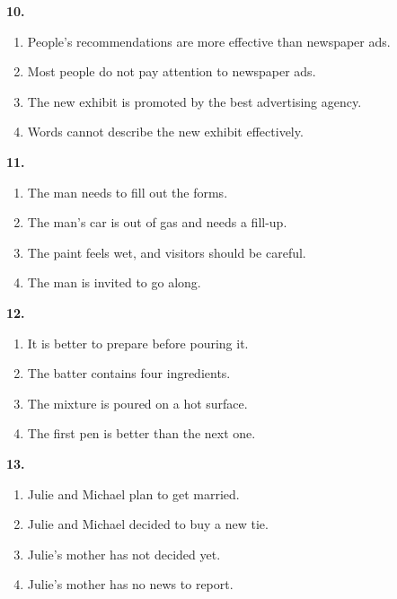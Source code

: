 \documentclass[12pt]{article}
\begin{document}
\vspace{0.25\baselineskip}
\noindent\textbf{10.}
\begin{enumerate}[label=(\Alph*),leftmargin=*,itemsep=0.2em]
\item People's recommendations are more effective than newspaper ads.
\item Most people do not pay attention to newspaper ads.
\item The new exhibit is promoted by the best advertising agency.
\item Words cannot describe the new exhibit effectively.
\end{enumerate}
\par
\vspace{0.25\baselineskip}
\noindent\textbf{11.}
\begin{enumerate}[label=(\Alph*),leftmargin=*,itemsep=0.2em]
\item The man needs to fill out the forms.
\item The man's car is out of gas and needs a fill-up.
\item The paint feels wet, and visitors should be careful.
\item The man is invited to go along.
\end{enumerate}
\par
\vspace{0.25\baselineskip}
\noindent\textbf{12.}
\begin{enumerate}[label=(\Alph*),leftmargin=*,itemsep=0.2em]
\item It is better to prepare before pouring it.
\item The batter contains four ingredients.
\item The mixture is poured on a hot surface.
\item The first pen is better than the next one.
\end{enumerate}
\par
\vspace{0.25\baselineskip}
\noindent\textbf{13.}
\begin{enumerate}[label=(\Alph*),leftmargin=*,itemsep=0.2em]
\item Julie and Michael plan to get married.
\item Julie and Michael decided to buy a new tie.
\item Julie's mother has not decided yet.
\item Julie's mother has no news to report.
\end{enumerate}
\par
\end{document}
